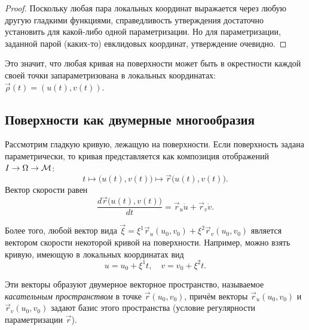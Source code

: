 \begin{proof}
	Поскольку любая пара локальных координат выражается через любую другую гладкими функциями, справедливость утверждения достаточно установить для какой-либо одной параметризации. Но для параметризации, заданной парой (каких-то) евклидовых координат, утверждение очевидно.
\end{proof}

Это значит, что любая кривая на поверхности может быть в окрестности каждой своей точки запараметризована в локальных координатах: $\vec{\rho}(t) = (u(t), v(t))$.

\subsection{Поверхности как двумерные многообразия}

Рассмотрим гладкую кривую, лежащую на поверхности. Если поверхность задана параметрически, то кривая представляется как композиция отображений $I \to \Omega \to \mathcal{M}$:
\[
	t \mapsto \big(u(t), v(t)\big) \mapsto \vec{r}\big(u(t), v(t)\big).
\]
Вектор скорости равен
\[
	\frac{d\vec{r}\big(u(t), v(t)\big)}{dt} = \vec{r}_u\dot{u} + \vec{r}_v\dot{v}.
\]

Более того, любой вектор вида $\vec{\xi} = \xi^1\vec{r}_u(u_0, v_0) + \xi^2\vec{r}_v(u_0, v_0)$ является вектором скорости некоторой кривой на поверхности. Например, можно взять кривую, имеющую в локальных координатах вид
\[
	u = u_0 + \xi^1t,\quad v = v_0 + \xi^2t.
\]

Эти векторы образуют двумерное векторное пространство, называемое \textit{касательным пространством} в точке $\vec{r}(u_0, v_0)$, причём векторы $\vec{r}_u(u_0, v_0)$ и $\vec{r}_v(u_0, v_0)$ задают базис этого пространства (условие регулярности параметризации $\vec{r}$).


